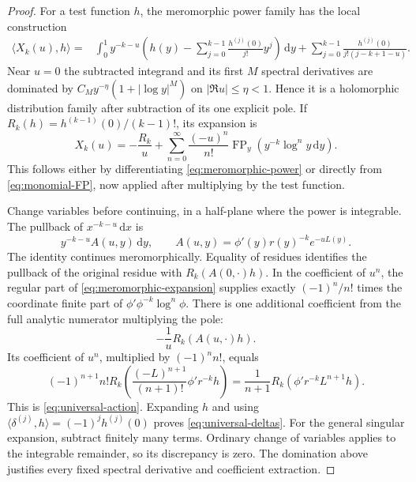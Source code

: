 \documentclass[11pt]{article}
\theoremstyle{definition}\newtheorem{definition}[theorem]{Definition}
\theoremstyle{remark}\newtheorem{remark}[theorem]{Remark}
\DeclareMathOperator{\FP}{FP}
\newcommand{\dd}{\,\mathrm d}
\begin{document}
\begin{proof}
For a test function $h$, the meromorphic power family has the local construction
\begin{align}\label{eq:meromorphic-power}
\langle X_k(u),h\rangle={}&
\int_0^1y^{-k-u}\left(h(y)-\sum_{j=0}^{k-1}\frac{h^{(j)}(0)}{j!}y^j\right)\dd y
+\sum_{j=0}^{k-1}\frac{h^{(j)}(0)}{j!(j-k+1-u)}.
\end{align}
Near $u=0$ the subtracted integrand and its first $M$ spectral derivatives are dominated by $C_My^{-\eta}(1+|\log y|^M)$ on $|\Re u|\le\eta<1$. Hence it is a holomorphic distribution family after subtraction of its one explicit pole. If
$R_k(h)=h^{(k-1)}(0)/(k-1)!$, its expansion is
\begin{equation}\label{eq:meromorphic-expansion}
X_k(u)=-\frac{R_k}{u}
+\sum_{n=0}^{\infty}\frac{(-u)^n}{n!}\FP_y(y^{-k}\log^n y\dd y).
\end{equation}
This follows either by differentiating \eqref{eq:meromorphic-power} or directly from \eqref{eq:monomial-FP}, now applied after multiplying by the test function.

Change variables before continuing, in a half-plane where the power is integrable. The pullback of $x^{-k-u}\dd x$ is
\[
y^{-k-u}A(u,y)\dd y,\qquad
A(u,y)=\phi'(y)r(y)^{-k}e^{-uL(y)}.
\]
The identity continues meromorphically. Equality of residues identifies the pullback of the original residue with $R_k(A(0,\cdot)h)$. In the coefficient of $u^n$, the regular part of \eqref{eq:meromorphic-expansion} supplies exactly
$(-1)^n/n!$ times the coordinate finite part of
$\phi'\phi^{-k}\log^n\phi$.
There is one additional coefficient from the full analytic numerator multiplying the pole:
\[
-\frac1uR_k(A(u,\cdot)h).
\]
Its coefficient of $u^n$, multiplied by $(-1)^nn!$, equals
\[
(-1)^{n+1}n!R_k\left(\frac{(-L)^{n+1}}{(n+1)!}\phi'r^{-k}h\right)
=\frac1{n+1}R_k(\phi'r^{-k}L^{n+1}h).
\]
This is \eqref{eq:universal-action}. Expanding $h$ and using
$\langle\delta^{(j)},h\rangle=(-1)^jh^{(j)}(0)$ proves \eqref{eq:universal-deltas}.
For the general singular expansion, subtract finitely many terms. Ordinary change of variables applies to the integrable remainder, so its discrepancy is zero. The domination above justifies every fixed spectral derivative and coefficient extraction.
\end{proof}
\end{document}
